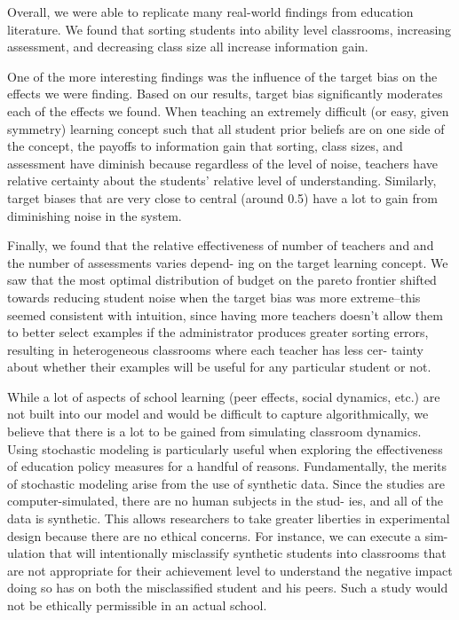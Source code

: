 \documentclass[10pt, letterpaper]{article}
\begin{document}
Overall, we were able to replicate many real-world findings from
education literature. We found that sorting students into ability level
classrooms, increasing assessment, and decreasing class size all
increase information gain.

One of the more interesting findings was the influence of the target
bias on the effects we were finding. Based on our results, target bias
significantly moderates each of the effects we found. When teaching an
extremely difficult (or easy, given symmetry) learning concept such that
all student prior beliefs are on one side of the concept, the payoffs to
information gain that sorting, class sizes, and assessment have diminish
because regardless of the level of noise, teachers have relative
certainty about the students' relative level of understanding.
Similarly, target biases that are very close to central (around 0.5)
have a lot to gain from diminishing noise in the system.

Finally, we found that the relative effectiveness of number of teachers
and and the number of assessments varies depend- ing on the target
learning concept. We saw that the most optimal distribution of budget on
the pareto frontier shifted towards reducing student noise when the
target bias was more extreme--this seemed consistent with intuition,
since having more teachers doesn't allow them to better select examples
if the administrator produces greater sorting errors, resulting in
heterogeneous classrooms where each teacher has less cer- tainty about
whether their examples will be useful for any particular student or not.

While a lot of aspects of school learning (peer effects, social
dynamics, etc.) are not built into our model and would be difficult to
capture algorithmically, we believe that there is a lot to be gained
from simulating classroom dynamics. Using stochastic modeling is
particularly useful when exploring the effectiveness of education policy
measures for a handful of reasons. Fundamentally, the merits of
stochastic modeling arise from the use of synthetic data. Since the
studies are computer-simulated, there are no human subjects in the stud-
ies, and all of the data is synthetic. This allows researchers to take
greater liberties in experimental design because there are no ethical
concerns. For instance, we can execute a sim- ulation that will
intentionally misclassify synthetic students into classrooms that are
not appropriate for their achievement level to understand the negative
impact doing so has on both the misclassified student and his peers.
Such a study would not be ethically permissible in an actual school.
\end{document}
